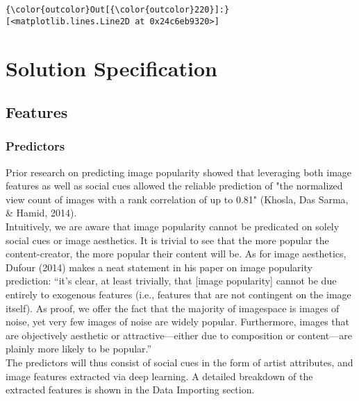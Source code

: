 \documentclass[11pt]{article}
\begin{document}
\begin{Verbatim}[commandchars=\\\{\}]
{\color{outcolor}Out[{\color{outcolor}220}]:} [<matplotlib.lines.Line2D at 0x24c6eb9320>]
\end{Verbatim}
            
    \begin{center}
    \end{center}

    \newpage
    \section{Solution Specification}

\subsection{Features}

\subsubsection{Predictors}

Prior research on predicting image popularity showed that leveraging
both image features as well as social cues allowed the reliable
prediction of "the normalized view count of images with a rank
correlation of up to 0.81" (Khosla, Das Sarma, \& Hamid, 2014).\\

Intuitively, we are aware that image popularity cannot be predicated on
solely social cues or image aesthetics. It is trivial to see that the
more popular the content-creator, the more popular their content will
be. As for image aesthetics, Dufour (2014) makes a neat statement in his
paper on image popularity prediction: ``it's clear, at least trivially,
that {[}image popularity{]} cannot be due entirely to exogenous features
(i.e., features that are not contingent on the image itself). As proof,
we offer the fact that the majority of imagespace is images of noise,
yet very few images of noise are widely popular. Furthermore, images
that are objectively aesthetic or attractive---either due to composition
or content---are plainly more likely to be popular.''\\

The predictors will thus consist of social cues in the form of artist
attributes, and image features extracted via deep learning. A detailed
breakdown of the extracted features is shown in the Data Importing
section.
\end{document}
